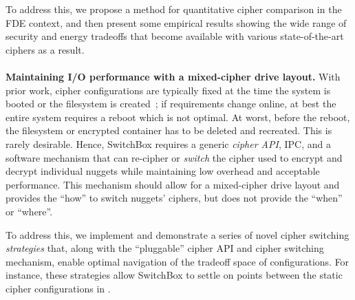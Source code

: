 To address this, we propose a method for quantitative cipher comparison in the
FDE context, and then present some empirical results showing the wide range of
security and energy tradeoffs that become available with various
state-of-the-art ciphers as a result.\\
\\
\textbf{Maintaining I/O performance with a mixed-cipher drive layout.} With
prior work, cipher configurations are typically fixed at the time the system is
booted or the filesystem is created~\cite{CiteAllTheFilesystems}; if
requirements change online, at best the entire system requires a reboot which is
not optimal. At worst, before the reboot, the filesystem or encrypted container
has to be deleted and recreated. This is rarely desirable. Hence, SwitchBox
requires a generic \emph{cipher API}, IPC, and a software mechanism that can
re-cipher or \emph{switch} the cipher used to encrypt and decrypt individual
nuggets while maintaining low overhead and acceptable performance. This
mechanism should allow for a mixed-cipher drive layout and provides the ``how''
to switch nuggets' ciphers, but does not provide the ``when'' or ``where''.

To address this, we implement and demonstrate a series of novel cipher switching
\textit{strategies} that, along with the ``pluggable'' cipher API and cipher
switching mechanism, enable optimal navigation of the tradeoff space of
configurations. For instance, these strategies allow SwitchBox to settle on
points between the static cipher configurations in .

